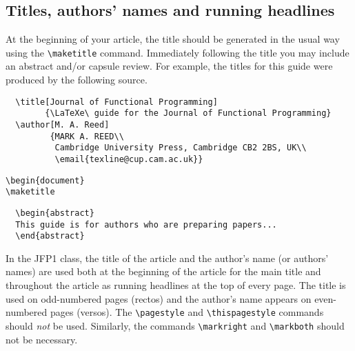\documentclass{jfp1}
\begin{document}
\subsection{Titles, authors' names and running headlines}

At the beginning of your article, the title should be generated in the
usual way using the \verb"\maketitle" command. Immediately following the
title you may include an abstract and/or capsule review. For example, the titles
for this guide were produced by the following source.
%
\begin{verbatim}
  \title[Journal of Functional Programming]
        {\LaTeXe\ guide for the Journal of Functional Programming}
  \author[M. A. Reed]
         {MARK A. REED\\
          Cambridge University Press, Cambridge CB2 2BS, UK\\
          \email{texline@cup.cam.ac.uk}}
\end{verbatim}

\verb"\begin{document}"\\
\indent\verb"\maketitle"

\begin{verbatim}
  \begin{abstract}
  This guide is for authors who are preparing papers...
  \end{abstract}
\end{verbatim}

In the JFP1 class, the title of the article and the author's name (or
authors' names) are used both at the beginning of the article for the main
title and throughout the article as running headlines at the top of every
page. The title is used on odd-numbered pages (rectos) and the author's name
appears on even-numbered pages (versos). The \verb"\pagestyle" and
\verb"\thispagestyle" commands should \emph{not} be used.  Similarly, the
commands \verb"\markright" and \verb"\markboth" should not be necessary.
\end{document}
